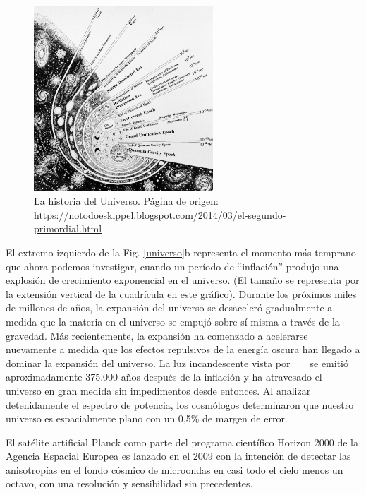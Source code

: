 \begin{figure}[t!]
\centering
\includegraphics[width=0.6\textwidth]{Fisica_de_Particulas/imagenes/History_of_the_Universe_(Fermilab_1989).jpg}
\caption{La historia del Universo. Página de origen: \url{https://notodoeskippel.blogspot.com/2014/03/el-segundo-primordial.html}}
\label{universo2}
\end{figure}

El extremo izquierdo  de la Fig. \ref{universo}b representa el momento más temprano que ahora podemos investigar, cuando un período de ``inflación'' produjo una explosión de crecimiento exponencial en el universo. (El tamaño se representa por la extensión vertical de la cuadrícula en este gráfico). Durante los próximos miles de millones de años, la expansión del universo se desaceleró gradualmente a medida que la materia en el universo se empujó sobre sí misma a través de la gravedad. Más recientemente, la expansión ha comenzado a acelerarse nuevamente a medida que los efectos repulsivos de la energía oscura han llegado a dominar la expansión del universo. La luz incandescente vista por ~ \WMAP ~ se emitió aproximadamente 375.000 a\~nos después de la inflación y ha atravesado el universo en gran medida sin impedimentos desde entonces. %
Al analizar detenidamente el espectro de potencia, los cosmólogos determinaron que nuestro universo es espacialmente plano con un 0,5\% de margen de error.

El satélite artificial Planck como parte del programa científico Horizon 2000 de la Agencia Espacial Europea es lanzado en el 2009 con la intención de detectar las anisotropías en el fondo cósmico de microondas en casi todo el cielo menos un octavo, con una resolución y sensibilidad sin precedentes. 

